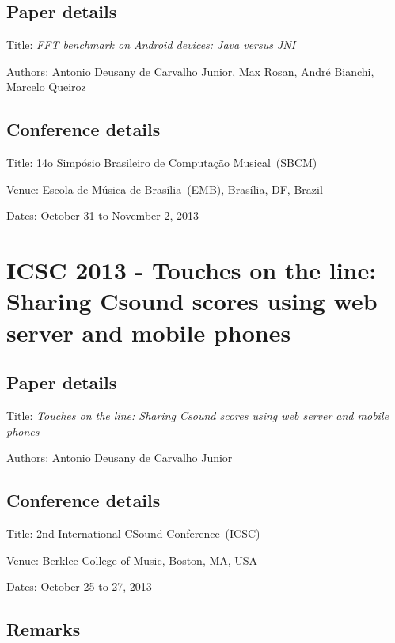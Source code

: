 \subsection*{Paper details}

Title: \textit{FFT benchmark on Android devices: Java versus JNI}

Authors: Antonio Deusany de Carvalho Junior, Max Rosan, André Bianchi, Marcelo Queiroz

\subsection*{Conference details}

Title: 14o Simpósio Brasileiro de Computação Musical~(SBCM)

Venue: Escola de Música de Brasília~(EMB), Brasília, DF, Brazil

Dates: October 31 to November 2, 2013



\section{ICSC 2013 - Touches on the line: Sharing Csound scores using web server and mobile phones}
\label{ape:papericsc2013}

\subsection*{Paper details}

Title: \textit{Touches on the line: Sharing Csound scores using web server and mobile phones}

Authors: Antonio Deusany de Carvalho Junior

\subsection*{Conference details}

Title: 2nd International CSound Conference~(ICSC)

Venue: Berklee College of Music, Boston, MA, USA

Dates: October 25 to 27, 2013

\subsection*{Remarks}

